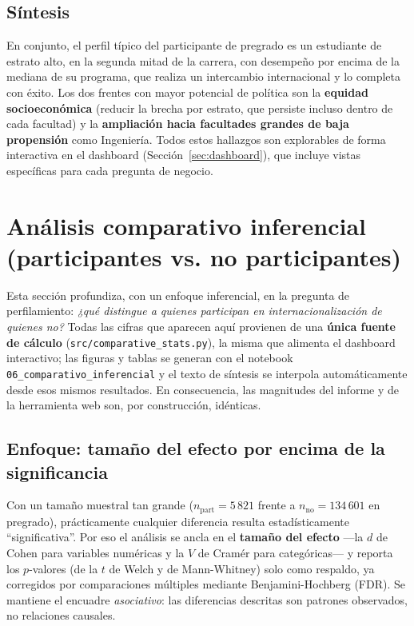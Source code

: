 \documentclass[12pt,a4paper]{article}
\begin{document}
\subsection*{Síntesis}
En conjunto, el perfil típico del participante de pregrado es un estudiante de
estrato alto, en la segunda mitad de la carrera, con desempeño por encima de la
mediana de su programa, que realiza un intercambio internacional y lo completa con
éxito. Los dos frentes con mayor potencial de política son la \textbf{equidad
socioeconómica} (reducir la brecha por estrato, que persiste incluso dentro de
cada facultad) y la \textbf{ampliación hacia facultades grandes de baja propensión}
como Ingeniería. Todos estos hallazgos son explorables de forma interactiva en el
dashboard (Sección~\ref{sec:dashboard}), que incluye vistas específicas para cada
pregunta de negocio.

\section{Análisis comparativo inferencial (participantes vs. no participantes)}
\label{sec:comparativo}
Esta sección profundiza, con un enfoque inferencial, en la pregunta de
perfilamiento: \emph{¿qué distingue a quienes participan en internacionalización
de quienes no?} Todas las cifras que aparecen aquí provienen de una \textbf{única
fuente de cálculo} (\texttt{src/comparative\_stats.py}), la misma que alimenta el
dashboard interactivo; las figuras y tablas se generan con el notebook
\texttt{06\_comparativo\_inferencial} y el texto de síntesis se interpola
automáticamente desde esos mismos resultados. En consecuencia, las magnitudes del
informe y de la herramienta web son, por construcción, idénticas.



\subsection{Enfoque: tamaño del efecto por encima de la significancia}
Con un tamaño muestral tan grande ($n_{\text{part}} = 5\,821$ frente a
$n_{\text{no}} = 134\,601$ en pregrado), prácticamente cualquier diferencia
resulta estadísticamente ``significativa''. Por eso el análisis se ancla en el
\textbf{tamaño del efecto} ---la $d$ de Cohen para variables numéricas y la $V$ de
Cramér para categóricas--- y reporta los $p$-valores (de la $t$ de Welch y de
Mann-Whitney) solo como respaldo, ya corregidos por comparaciones múltiples
mediante Benjamini-Hochberg (FDR). Se mantiene el encuadre \emph{asociativo}: las
diferencias descritas son patrones observados, no relaciones causales.
\end{document}
